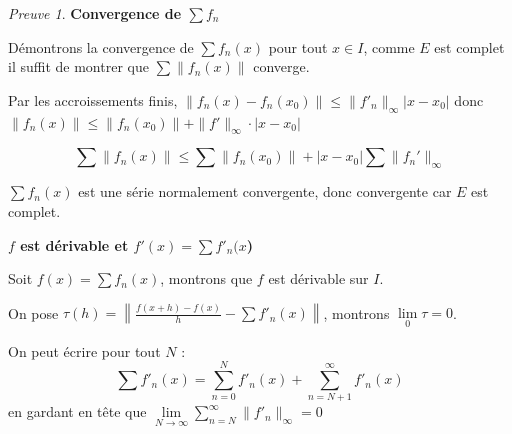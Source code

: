 \documentclass[]{article}
\theoremstyle{remark}
\newtheorem{myproof}{Preuve}
\theoremstyle{definition}
\newenvironment{proofpart}[1]{
	\noindent
	{\textbf{\boldmath #1}}
}{
	\checkmark
}
\begin{document}
\begin{myproof}

	\leavevmode
	
	\begin{proofpart}{Convergence de $\sum f_n$}
	
		Démontrons la convergence de $\sum f_n(x)$ pour tout $x \in I$, comme $E$ est complet il suffit de montrer que $\sum \|f_n(x)\|$ converge.
		
		Par les accroissements finis, $\|f_n(x) - f_n(x_0)\| \leqslant \|f'_n\|_{\infty} |x - x_0|$ donc $\|f_n(x)\| \leqslant \|f_n(x_0)\| + \|f'\|_{\infty}\cdot|x-x_0|$
		
		$$\sum \|f_n(x)\| \leqslant \sum \|f_n(x_0)\| + |x-x_0| \sum \|f_n'\|_{\infty}$$
		
		$\sum f_n(x)$ est une série normalement convergente, donc convergente car $E$ est complet.
	\end{proofpart}
	
	\begin{proofpart}{$f$ est dérivable et $f'(x) = \sum f'_n(x$)}
	
		\leavevmode
	
		Soit $f(x) = \sum f_n(x)$, montrons que $f$ est dérivable sur $I$.
		
		On pose $\displaystyle \tau(h) = \left\|\frac{f(x+h) - f(x)}{h} - \sum f'_n(x)\right\|$, montrons $\lim\limits_{0} \tau = 0$.
		
		On peut écrire pour tout $N$ : $$\sum f'_n(x) = \sum_{ n = 0}^{N} f'_n(x) + \sum_{n = N+1}^{\infty} f'_n(x)$$ en gardant en tête que $\displaystyle \lim\limits_{N \to \infty} \sum_{n=N}^{\infty}\|f'_n\|_{\infty} = 0$
		

\end{proofpart}
\end{myproof}
\end{document}
